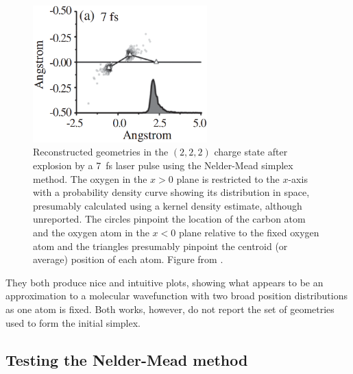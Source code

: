 \begin{figure}
  \centering
  \includegraphics[width=0.6\textwidth]{gfx/SimplexPRL}
  \caption[Reconstructed  in the $(2,2,2)$ charge state using the Nelder-Mead simplex method.]
  {Reconstructed  geometries in the $(2,2,2)$ charge state after explosion by a \SI{7}{\fs} laser pulse using the Nelder-Mead simplex method. The oxygen in the $x>0$ plane is restricted to the $x$-axis with a probability density curve showing its distribution in space, presumably calculated using a kernel density estimate, although unreported. The circles pinpoint the location of the carbon atom and the oxygen atom in the $x<0$ plane relative to the fixed oxygen atom and the triangles presumably pinpoint the centroid (or average) position of each atom. Figure from \citet{Bocharova11}.}
  \label{fig:simplexPRL}
\end{figure}

They both produce nice and intuitive plots, showing what appears to be an approximation to a molecular wavefunction with two broad position distributions as one atom is fixed. Both works, however, do not report the set of geometries used to form the initial simplex.

\subsection{Testing the Nelder-Mead method} \label{ssec:simplexFail}

